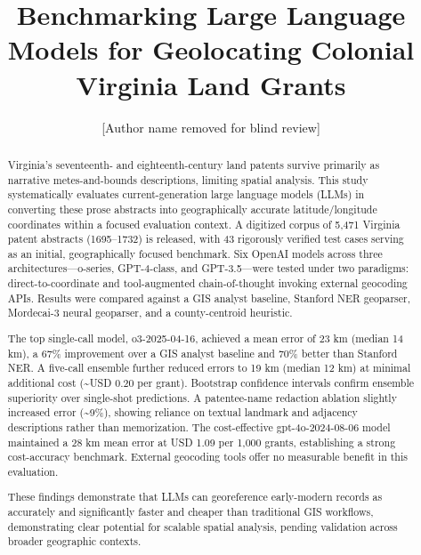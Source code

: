 \documentclass{josis}
\begin{document}
\title{Benchmarking Large Language Models for Geolocating Colonial Virginia Land Grants}
\author{[Author name removed for blind review]}

\maketitle


\begin{abstract}
Virginia's seventeenth- and eighteenth-century land patents survive primarily as narrative metes-and-bounds descriptions, limiting spatial analysis. This study systematically evaluates current-generation large language models (LLMs) in converting these prose abstracts into geographically accurate latitude/longitude coordinates within a focused evaluation context. A digitized corpus of 5,471 Virginia patent abstracts (1695–1732) is released, with 43 rigorously verified test cases serving as an initial, geographically focused benchmark. Six OpenAI models across three architectures—o-series, GPT-4-class, and GPT-3.5—were tested under two paradigms: direct-to-coordinate and tool-augmented chain-of-thought invoking external geocoding APIs. Results were compared against a GIS analyst baseline, Stanford NER geoparser, Mordecai-3 neural geoparser, and a county-centroid heuristic.

The top single-call model, o3-2025-04-16, achieved a mean error of 23 km (median 14 km), a 67\% improvement over a GIS analyst baseline and 70\% better than Stanford NER. A five-call ensemble further reduced errors to 19 km (median 12 km) at minimal additional cost (\textasciitilde USD 0.20 per grant). Bootstrap confidence intervals confirm ensemble superiority over single-shot predictions. A patentee-name redaction ablation slightly increased error (\textasciitilde 9\%), showing reliance on textual landmark and adjacency descriptions rather than memorization. The cost-effective gpt-4o-2024-08-06 model maintained a 28 km mean error at USD 1.09 per 1,000 grants, establishing a strong cost-accuracy benchmark. External geocoding tools offer no measurable benefit in this evaluation.

These findings demonstrate that LLMs can georeference early-modern records as accurately and significantly faster and cheaper than traditional GIS workflows, demonstrating clear potential for scalable spatial analysis, pending validation across broader geographic contexts.
\end{abstract}





\end{document}
